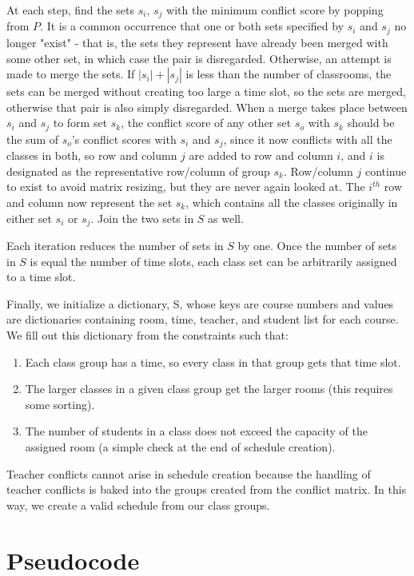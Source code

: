 \documentclass[11pt, oneside]{article}   	%
\begin{document}
 At each step, find the sets $s_i$, $s_j$ with the minimum conflict score by popping from $P$. It is a common occurrence that one or both sets specified by $s_i$ and $s_j$ no longer "exist" - that is, the sets they represent have already been merged with some other set, in which case the pair is disregarded. Otherwise, an attempt is made to merge the sets. If $|s_i| + |s_j|$ is less than the number of classrooms, the sets can be merged without creating too large a time slot, so the sets are merged, otherwise that pair is also simply disregarded. When a merge takes place between $s_i$ and $s_j$ to form set $s_k$, the conflict score of any other set $s_o$ with $s_k$ should be the sum of $s_o$'s conflict scores with $s_i$ and $s_j$, since it now conflicts with all the classes in both, so row and column $j$ are added to row and column $i$, and $i$ is designated as the representative row/column of group $s_k$. Row/column $j$ continue to exist to avoid matrix resizing, but they are never again looked at. The $i^{th}$ row and column now represent the set $s_k$, which contains all the classes originally in either set $s_i$ or $s_j$. Join the two sets in $S$ as well.

Each iteration reduces the number of sets in $S$ by one. Once the number of sets in $S$ is equal the number of time slots, each class set can be arbitrarily assigned to a time slot.

Finally, we initialize a dictionary, S, whose keys are course numbers and values are dictionaries containing room, time, teacher, and student list for each course. We fill out this dictionary from the constraints such that:
\begin{enumerate}
    \item Each class group has a time, so every class in that group gets that time slot.
    \item The larger classes in a given class group get the larger rooms (this requires some sorting).
    \item The number of students in a class does not exceed the capacity of the assigned room (a simple check at the end of schedule creation).
\end{enumerate}

Teacher conflicts cannot arise in schedule creation because the handling of teacher conflicts is baked into the groups created from the conflict matrix. In this way, we create a valid schedule from our class groups.

\section{Pseudocode}
\begin{algorithm}
\end{algorithm}
\end{document}
